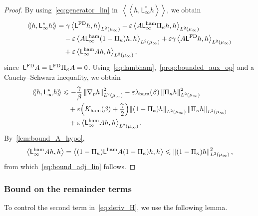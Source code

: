 \documentclass[onefignum,onetabnum]{siamart251216} %
\newcommand{\norm}[1]{\left\lVert#1\right\rVert}
\renewcommand{\leq}{\leqslant}
\newcommand{\mescin}{\mu}
\newcommand{\projvit}{\Pi_{\kappa}}
\newcommand{\adj}{\mathsf{L}_\infty^*}
\newcommand{\Lham}{\mathsf{L}^{\rm{ham}}}
\newcommand{\LFD}{\mathsf{L}^{\rm{FD}}}
\newcommand{\slangle}[1]{\left\langle #1 \right\rangle}
\newcommand{\dblangle}[1]{\left\langle\!\left\langle #1 \right\rangle\!\right\rangle}
\newcommand{\norml}[1]{\norm{#1}_{L^2(\mescin_\infty)}}
\newcommand{\eps}{\varepsilon}
\newcommand{\lambham}{\lambda_{\rm{ham}}(\beta)}
\newcommand{\kham}{K_{\rm{ham}}(\beta)}
\theoremstyle{plain}
\numberwithin{equation}{section}
\numberwithin{theorem}{section}
\begin{document}
\begin{proof}
    By using~\eqref{eq:generator_lin} in~$\dblangle{h,\adj h}$, we obtain
\begin{align*}
    \dblangle{h,\adj h} &=\gamma\slangle{\LFD h, h}_{L^2(\mescin_\infty)} - \eps\slangle{A \Lham_\infty \projvit h,h}_{L^2(\mescin_\infty)} \\
    &\quad - \eps\slangle{A \Lham_\infty(1 - \projvit) h, h}_{L^2(\mescin_\infty)}
    + \eps\gamma\slangle{A\LFD h, h}_{L^2(\mescin_\infty)} \\
    &\quad + \eps\slangle{\Lham_\infty A h, h}_{L^2(\mescin_\infty)},
\end{align*}
since~$\LFD A = \LFD\projvit A = 0$. Using~\eqref{eq:lambham},~\cref{prop:bounded_aux_op} and a Cauchy--Schwarz inequality, we obtain
\begin{align*}
    \dblangle{h,\adj h} &\leq -\frac{\gamma}{\beta}\norml{\nabla_p h}^2 -\eps\lambham \norml{\projvit h}^2 \\
    &\quad+\eps\!\left(\kham +\frac{\gamma}{2}\right)\!\norml{(1-\projvit)h}\norml{\projvit h} \\
    &\quad +\eps\slangle{\Lham_\infty A h, h}_{L^2(\mescin_\infty)}.
\end{align*}
By~\cref{lem:bound_A_hypo},
\begin{align*}
    \slangle{\Lham_\infty A h, h} = \slangle{(1-\projvit)\Lham A (1-\projvit)h,h} \leq \norml{(1-\projvit)h}^2,
\end{align*}
from which~\eqref{eq:bound_adj_lin} follows.
\end{proof}
\subsubsection{Bound on the remainder terms}
\label{subsub:bound_remainder}
To control the second term in~\eqref{eq:deriv_H},
we use the following lemma.
\end{document}
